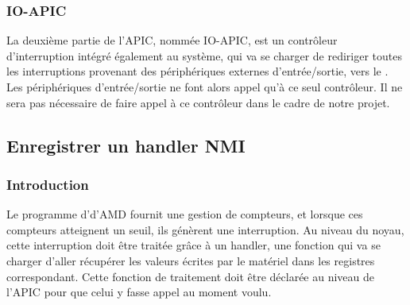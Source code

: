 					\subsubsection{IO-APIC}
						La deuxième partie de l'APIC, nommée IO-APIC, est un contrôleur d'interruption intégré également au système, qui va se charger de rediriger toutes les interruptions provenant des périphériques externes d'entrée/sortie, vers le \lap. Les périphériques d'entrée/sortie ne font alors appel qu'à ce seul contrôleur. Il ne sera pas nécessaire de faire appel à ce contrôleur dans le cadre de notre projet.
				\subsection{Enregistrer un handler NMI}
					\subsubsection{Introduction}
						Le programme d'\IBS d'AMD fournit une gestion de compteurs, et lorsque ces compteurs atteignent un seuil, ils génèrent une interruption. Au niveau du noyau, cette interruption doit être traitée grâce à un handler, une fonction qui va se charger d'aller récupérer les valeurs écrites par le matériel dans les registres correspondant. Cette fonction de traitement doit être déclarée au niveau de l'APIC pour que celui y fasse appel au moment voulu.
